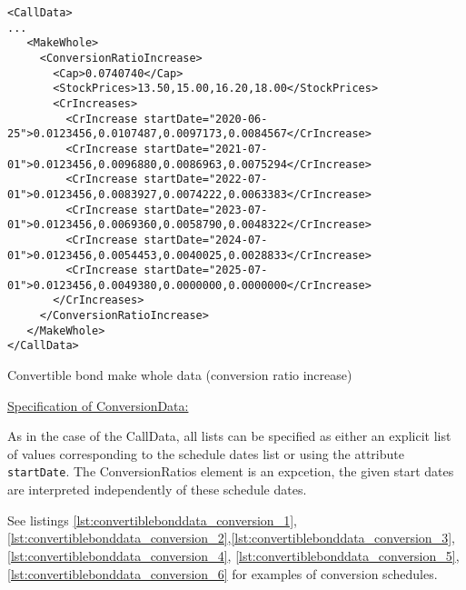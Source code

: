 \begin{listing}[H]
\begin{verbatim}
<CallData>
...
   <MakeWhole>
     <ConversionRatioIncrease>
       <Cap>0.0740740</Cap>
       <StockPrices>13.50,15.00,16.20,18.00</StockPrices>
       <CrIncreases>
         <CrIncrease startDate="2020-06-25">0.0123456,0.0107487,0.0097173,0.0084567</CrIncrease>
         <CrIncrease startDate="2021-07-01">0.0123456,0.0096880,0.0086963,0.0075294</CrIncrease>
         <CrIncrease startDate="2022-07-01">0.0123456,0.0083927,0.0074222,0.0063383</CrIncrease>
         <CrIncrease startDate="2023-07-01">0.0123456,0.0069360,0.0058790,0.0048322</CrIncrease>
         <CrIncrease startDate="2024-07-01">0.0123456,0.0054453,0.0040025,0.0028833</CrIncrease>
         <CrIncrease startDate="2025-07-01">0.0123456,0.0049380,0.0000000,0.0000000</CrIncrease>
       </CrIncreases>
     </ConversionRatioIncrease>
   </MakeWhole>
</CallData>
\end{verbatim}
\caption{Convertible bond make whole data (conversion ratio increase)}
\label{lst:convertiblebonddata_callputdata_7}
\end{listing}

\underline{Specification of ConversionData:}

As in the case of the CallData, all lists can be specified as either an explicit list of values corresponding to the
schedule dates list or using the attribute \verb+startDate+. The ConversionRatios element is an expcetion, the given
start dates are interpreted independently of these schedule dates.

See listings \ref{lst:convertiblebonddata_conversion_1},
\ref{lst:convertiblebonddata_conversion_2},\ref{lst:convertiblebonddata_conversion_3},\ref{lst:convertiblebonddata_conversion_4},
\ref{lst:convertiblebonddata_conversion_5},\ref{lst:convertiblebonddata_conversion_6}
for examples of conversion schedules.

